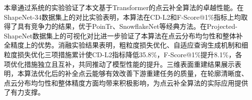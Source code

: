 本章通过系统的实验验证了本文基于Transformer的点云补全算法的卓越性能。在ShapeNet-34数据集上的对比实验表明，本算法在CD-L2和F-Score@1\%指标上均取得了具有竞争力的结果，优于PoinTr、SnowflakeNet等经典方法。在Projected-ShapeNet数据集上的可视化对比进一步验证了本算法在点云分布均匀性和整体补全精度上的优势。消融实验结果表明，粗粒度损失优化、自适应查询生成机制和细粒度损失优化三项措施累计使CD-L2指标降低35.8\%，F-Score@1\%提升8.1\%，各项优化措施独立且互补，共同推动了模型性能的提升。三维表面重建结果展示表明，本算法优化后的补全点云能够有效改善下游重建任务的质量，在轮廓清晰度、点云分布均匀性和整体精度方面均带来积极影响，为点云补全算法的实际应用提供了有力支撑。